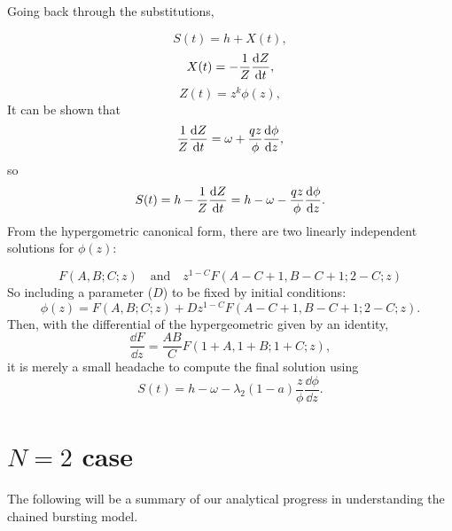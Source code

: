 Going back through the substitutions,

$$S(t) = h + X(t),$$
$$X(t) = -\frac{1}{Z}\displaystyle\frac{{\rm d} Z}{{\rm d} t},$$
$$Z(t) = z^k\phi(z),$$
It can be shown that 
$$\frac{1}{Z}\displaystyle\frac{{\rm d} Z}{{\rm d} t} = \omega + \frac{q z}{\phi} \frac{{\rm d} \phi}{{\rm d} z},$$
so
$$S(t) = h - \frac{1}{Z}\displaystyle\frac{{\rm d} Z}{{\rm d} t}  = h - \omega - \frac{q z}{\phi} \frac{{\rm d} \phi}{{\rm d} z}.$$
From the hypergometric canonical form, there are two linearly independent solutions for $\phi(z)$:

$$F(A,B;C;z) \quad\text{and}\quad z^{1-C}F(A-C+1,B-C+1;2-C;z)$$
So including a parameter ($D$) to be fixed by initial conditions:
$$\phi(z) = F(A,B;C;z)+ D z^{1-C}F(A-C+1,B-C+1;2-C;z).$$
Then, with the differential of the hypergeometric given by an identity,
$$\frac{\dd F}{\dd z} = \frac{AB}{C}F(1+A,1+B;1+C;z),$$
it is merely a small headache to compute the final solution using 
$$S(t)   = h - \omega - \lambda_2(1-a)\frac{ z}{\phi} \frac{\dd \phi}{\dd z}.$$








































\section{$N = 2$ case}







The following will be a summary of our analytical progress in understanding the chained bursting model. 

